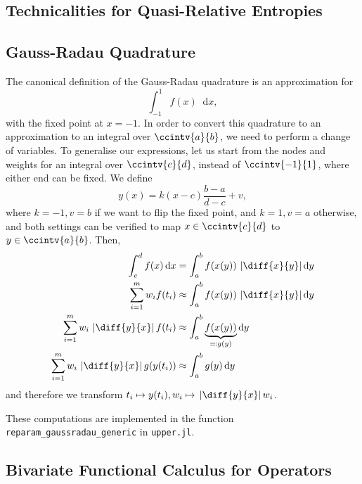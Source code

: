 \documentclass[10pt, a4paper]{article}
\numberwithin{equation}{section} %
\theoremstyle{definition}
\theoremstyle{plain}
\newcommand{\abs}[1]{\mathop{}\left\lvert#1\right\rvert}
\newcommand{\dif}{\mathop{}\!\mathrm{d}} %
\newcommand{\?}{\mathrel{?}} %
\begin{document}
\begin{appendices}
                    \section{Technicalities for Quasi-Relative Entropies}\label{sec:qretech}

                    \subsection{Gauss-Radau Quadrature}\label{sec:qretech_grq}

                    The canonical definition of the Gauss-Radau quadrature is an approximation for
                    \[ \int_{-1}^{1} f(x) \dif{x}, \]
                    with the fixed point at \(x = -1\). In order to convert this quadrature to an approximation to an integral over \(\ccintv{a}{b}\), we need to perform a change of variables. To generalise our expressions, let us start from the nodes and weights for an integral over \(\ccintv{c}{d}\), instead of \(\ccintv{-1}{1}\), where either end can be fixed. We define
                    \[ y(x) = k(x - c)\frac{b - a}{d - c} + v, \]
                    where \(k = -1, v = b\) if we want to flip the fixed point, and \(k = 1, v = a\) otherwise, and both settings can be verified to map \(x\in\ccintv{c}{d}\) to \(y\in\ccintv{a}{b}\). Then,
                    \begin{align*}
                      \int_{c}^{d} f(x) \dif{x} &= \int_{a}^{b} f(x(y)) \abs{\diff{x}{y}} \dif{y} \\
                      \sum_{i=1}^m w_i f(t_i) &\approx \int_{a}^{b} f(x(y)) \abs{\diff{x}{y}} \dif{y} \\
                      \sum_{i=1}^m w_i \abs{\diff{y}{x}} f(t_i) &\approx \int_{a}^{b} \underbrace{f(x(y))}_{\eqqcolon g(y)} \dif{y} \\
                      \sum_{i=1}^m w_i \abs{\diff{y}{x}} g(y(t_i)) &\approx \int_{a}^{b} g(y) \dif{y}
                    \end{align*}
                    and therefore we transform \(t_i \mapsto y(t_i), w_i \mapsto \abs{\diff{y}{x}} w_i\).

                    These computations are implemented in the function \verb`reparam_gaussradau_generic` in \verb`upper.jl`. 

                    \subsection{Bivariate Functional Calculus for Operators}


\end{appendices}
\end{document}
